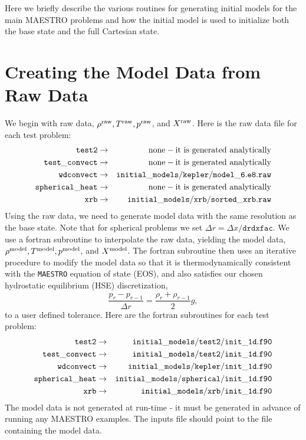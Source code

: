Here we briefly describe the various routines for generating initial models
for the main MAESTRO problems and how the initial model is used to initialize
both the base state and the full Cartesian state.

\section{Creating the Model Data from Raw Data}\label{Sec:Creating the Model Data from Raw Data}
\label{sec:initial_models_main}

We begin with raw data, $\rho^{\rm raw}, T^{\rm raw}, p^{\rm raw}$, and
$X^{\rm raw}$.  Here is the raw data file for each test problem:
\begin{eqnarray}
{\tt test2} & \rightarrow & \mathrm{none-it~ is~ generated~ analytically} \nonumber \nonumber \\
{\tt test\_convect} & \rightarrow & \mathrm{none-it~ is~ generated~ analytically} \nonumber \nonumber \\
{\tt wdconvect} & \rightarrow & {\tt initial\_models/kepler/model\_6.e8.raw} \nonumber \\
{\tt spherical\_heat} & \rightarrow & \mathrm{none-it~ is~ generated~ analytically} \nonumber \\
{\tt xrb} & \rightarrow & {\tt initial\_models/xrb/sorted\_xrb.raw} \nonumber
\end{eqnarray}
Using the raw data, we need to generate model data with the same
resolution as the base state.  Note that for spherical problems we set
$\Delta r = \Delta x/\mathtt{drdxfac}$.  We use a fortran subroutine
to interpolate the raw data, yielding the model data, $\rho^{\rm model},
T^{\rm model}, p^{\rm model}$, and $X^{\rm model}$.  The fortran subroutine
then uses an iterative procedure to modify the model data so that it
is thermodynamically consistent with the {\tt MAESTRO} equation of
state (EOS), and also satisfies our chosen hydrostatic equilibrium
(HSE) discretization,
\begin{equation}
\frac{p_r - p_{r-1}}{\Delta r} = \frac{\rho_r + \rho_{r-1}}{2}g,\label{HSE Discretization}
\end{equation}
to a user defined tolerance.  Here are the fortran subroutines for each test problem:
\begin{eqnarray}
{\tt test2} & \rightarrow & {\tt initial\_models/test2/init\_1d.f90} \nonumber \\
{\tt test\_convect} & \rightarrow & {\tt initial\_models/test2/init\_1d.f90} \nonumber \\
{\tt wdconvect} & \rightarrow & {\tt initial\_models/kepler/init\_1d.f90} \nonumber \\
{\tt spherical\_heat} & \rightarrow & {\tt initial\_models/spherical/init\_1d.f90} \nonumber \\
{\tt xrb} & \rightarrow & {\tt initial\_models/xrb/init\_1d.f90} \nonumber
\end{eqnarray}
The model data is not generated at run-time - it must be generated in
advance of running any MAESTRO examples.  The inputs file should point
to the file containing the model data.

